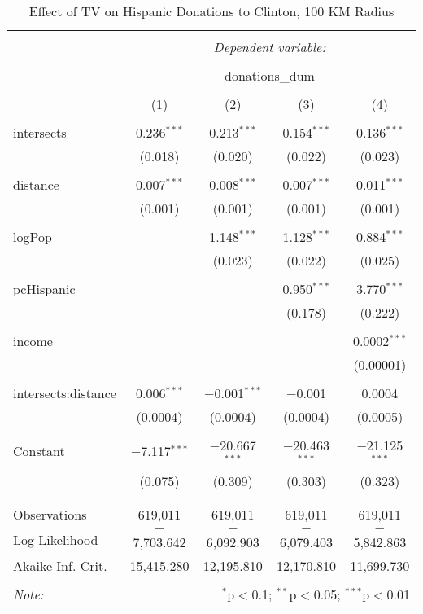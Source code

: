 
\begin{table}[!htbp] \centering 
  \caption{Effect of TV on Hispanic Donations to Clinton, 100 KM Radius} 
  \label{} 
\begin{tabular}{@{\extracolsep{-5pt}}lcccc} 
\\[-1.8ex]\hline 
\hline \\[-1.8ex] 
 & \multicolumn{4}{c}{\textit{Dependent variable:}} \\ 
\cline{2-5} 
\\[-1.8ex] & \multicolumn{4}{c}{donations\_dum} \\ 
\\[-1.8ex] & (1) & (2) & (3) & (4)\\ 
\hline \\[-1.8ex] 
 intersects & 0.236$^{***}$ & 0.213$^{***}$ & 0.154$^{***}$ & 0.136$^{***}$ \\ 
  & (0.018) & (0.020) & (0.022) & (0.023) \\ 
  & & & & \\ 
 distance & 0.007$^{***}$ & 0.008$^{***}$ & 0.007$^{***}$ & 0.011$^{***}$ \\ 
  & (0.001) & (0.001) & (0.001) & (0.001) \\ 
  & & & & \\ 
 logPop &  & 1.148$^{***}$ & 1.128$^{***}$ & 0.884$^{***}$ \\ 
  &  & (0.023) & (0.022) & (0.025) \\ 
  & & & & \\ 
 pcHispanic &  &  & 0.950$^{***}$ & 3.770$^{***}$ \\ 
  &  &  & (0.178) & (0.222) \\ 
  & & & & \\ 
 income &  &  &  & 0.0002$^{***}$ \\ 
  &  &  &  & (0.00001) \\ 
  & & & & \\ 
 intersects:distance & 0.006$^{***}$ & $-$0.001$^{***}$ & $-$0.001 & 0.0004 \\ 
  & (0.0004) & (0.0004) & (0.0004) & (0.0005) \\ 
  & & & & \\ 
 Constant & $-$7.117$^{***}$ & $-$20.667$^{***}$ & $-$20.463$^{***}$ & $-$21.125$^{***}$ \\ 
  & (0.075) & (0.309) & (0.303) & (0.323) \\ 
  & & & & \\ 
\hline \\[-1.8ex] 
Observations & 619,011 & 619,011 & 619,011 & 619,011 \\ 
Log Likelihood & $-$7,703.642 & $-$6,092.903 & $-$6,079.403 & $-$5,842.863 \\ 
Akaike Inf. Crit. & 15,415.280 & 12,195.810 & 12,170.810 & 11,699.730 \\ 
\hline 
\hline \\[-1.8ex] 
\textit{Note:}  & \multicolumn{4}{r}{$^{*}$p$<$0.1; $^{**}$p$<$0.05; $^{***}$p$<$0.01} \\ 
\end{tabular} 
\end{table} 
